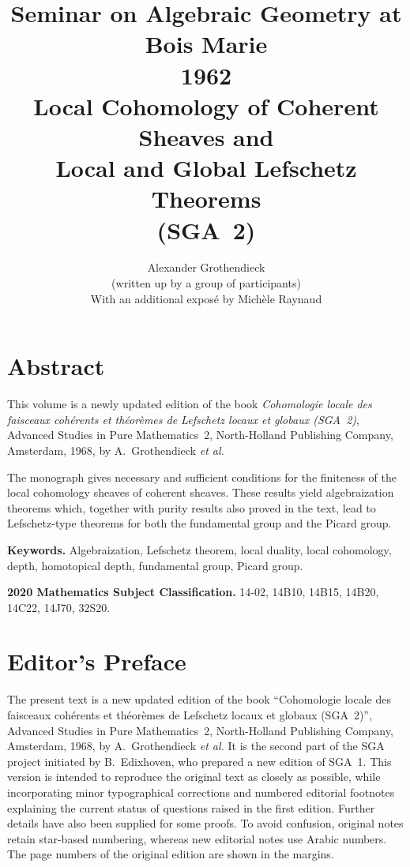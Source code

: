 \documentclass[11pt,a4paper,oneside]{book}
\theoremstyle{plain}
\theoremstyle{definition}
\theoremstyle{remark}
\begin{document}
\frontmatter

\title{Seminar on Algebraic Geometry at Bois Marie\\
   1962\\[0.4em]
   Local Cohomology of Coherent Sheaves and\\
   Local and Global Lefschetz Theorems\\
   (SGA~2)}

\author{Alexander Grothendieck\\
  {\small (written up by a group of participants)}\\[0.5em]
  With an additional expos\'e by Mich\`ele Raynaud}

\maketitle

\chapter*{Abstract}
This volume is a newly updated edition of the book
\emph{Cohomologie locale des faisceaux coh\'erents et th\'eor\`emes de
Lefschetz locaux et globaux (SGA~2)}, Advanced Studies in Pure Mathematics~2,
North-Holland Publishing Company, Amsterdam, 1968, by A.~Grothendieck
\emph{et al.}

The monograph gives necessary and sufficient conditions for the finiteness
of the local cohomology sheaves of coherent sheaves. These results yield
algebraization theorems which, together with purity results also proved in
the text, lead to Lefschetz-type theorems for both the fundamental group and
the Picard group.

\medskip
\noindent\textbf{Keywords.} Algebraization, Lefschetz theorem, local duality,
local cohomology, depth, homotopical depth, fundamental group, Picard group.

\smallskip
\noindent\textbf{2020 Mathematics Subject Classification.}
14-02, 14B10, 14B15, 14B20, 14C22, 14J70, 32S20.

\chapter*{Editor's Preface}

The present text is a new updated edition of the book
``Cohomologie locale des faisceaux coh\'erents et th\'eor\`emes de Lefschetz
locaux et globaux (SGA~2)'', Advanced Studies in Pure Mathematics~2,
North-Holland Publishing Company, Amsterdam, 1968, by A.~Grothendieck
\emph{et al.} It is the second part of the SGA project initiated by
B.~Edixhoven, who prepared a new edition of SGA~1. This version is intended
to reproduce the original text as closely as possible, while incorporating
minor typographical corrections and numbered editorial footnotes explaining
the current status of questions raised in the first edition. Further details
have also been supplied for some proofs. To avoid confusion, original notes
retain star-based numbering, whereas new editorial notes use Arabic numbers.
The page numbers of the original edition are shown in the margins.
\end{document}
